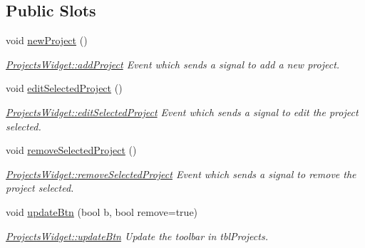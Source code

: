 \subsection*{Public Slots}
\begin{DoxyCompactItemize}
\item 
\hypertarget{classGui_1_1Widgets_1_1ProjectsWidget_acd6cd65ef7bf569ce4e44436d2f8b4f4}{void \hyperlink{classGui_1_1Widgets_1_1ProjectsWidget_acd6cd65ef7bf569ce4e44436d2f8b4f4}{new\-Project} ()}\label{classGui_1_1Widgets_1_1ProjectsWidget_acd6cd65ef7bf569ce4e44436d2f8b4f4}

\begin{DoxyCompactList}\small\item\em \hyperlink{classGui_1_1Widgets_1_1ProjectsWidget_a25a20fde082c2698d7067d10e5795c0f}{Projects\-Widget\-::add\-Project} Event which sends a signal to add a new project. \end{DoxyCompactList}\item 
\hypertarget{classGui_1_1Widgets_1_1ProjectsWidget_a33284320194d2c20ac6a47ebaaa57ad4}{void \hyperlink{classGui_1_1Widgets_1_1ProjectsWidget_a33284320194d2c20ac6a47ebaaa57ad4}{edit\-Selected\-Project} ()}\label{classGui_1_1Widgets_1_1ProjectsWidget_a33284320194d2c20ac6a47ebaaa57ad4}

\begin{DoxyCompactList}\small\item\em \hyperlink{classGui_1_1Widgets_1_1ProjectsWidget_a33284320194d2c20ac6a47ebaaa57ad4}{Projects\-Widget\-::edit\-Selected\-Project} Event which sends a signal to edit the project selected. \end{DoxyCompactList}\item 
\hypertarget{classGui_1_1Widgets_1_1ProjectsWidget_a02d9111ae56ff401bc512fa218161d94}{void \hyperlink{classGui_1_1Widgets_1_1ProjectsWidget_a02d9111ae56ff401bc512fa218161d94}{remove\-Selected\-Project} ()}\label{classGui_1_1Widgets_1_1ProjectsWidget_a02d9111ae56ff401bc512fa218161d94}

\begin{DoxyCompactList}\small\item\em \hyperlink{classGui_1_1Widgets_1_1ProjectsWidget_a02d9111ae56ff401bc512fa218161d94}{Projects\-Widget\-::remove\-Selected\-Project} Event which sends a signal to remove the project selected. \end{DoxyCompactList}\item 
void \hyperlink{classGui_1_1Widgets_1_1ProjectsWidget_a14ad312da4bc60148d97ef16c8a4fb8a}{update\-Btn} (bool b, bool remove=true)
\begin{DoxyCompactList}\small\item\em \hyperlink{classGui_1_1Widgets_1_1ProjectsWidget_a14ad312da4bc60148d97ef16c8a4fb8a}{Projects\-Widget\-::update\-Btn} Update the toolbar in tbl\-Projects. \end{DoxyCompactList}\end{DoxyCompactItemize}
